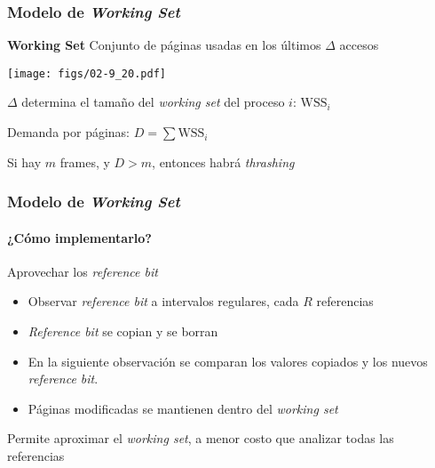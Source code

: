 \documentclass[letter]{beamer}
\begin{document}
\begin{frame}
  \frametitle{Modelo de {\em Working Set}}

  \begin{block}{{\bf Working Set}}
    Conjunto de páginas usadas en los últimos $\Delta$ accesos
  \end{block}

  \begin{center}
    \texttt{[image: figs/02-9\_20.pdf]}
  \end{center}

  $\Delta$ determina el tamaño del {\em working set} del proceso $i$: $\text{WSS}_i$
  
  \vspace{1em}
  
  Demanda por páginas: $D=\sum{\text{WSS}_i}$
  
  \vspace{1em}
  
  Si hay $m$ frames, y $D > m$, entonces habrá {\em thrashing}

\end{frame}

\begin{frame}
  \frametitle{Modelo de {\em Working Set}}
  \framesubtitle{¿Cómo implementarlo?}

  Aprovechar los {\em reference bit}
  
  \begin{itemize}
    \item Observar {\em reference bit} a intervalos regulares, cada $R$ referencias
    \item {\em Reference bit} se copian y se borran
    \item En la siguiente observación se comparan los valores copiados
          y los nuevos {\em reference bit}.
    \item Páginas modificadas se mantienen dentro del {\em working set}
  \end{itemize}
  Permite aproximar el {\em working set}, a menor costo que analizar todas las referencias

\end{frame}
\end{document}
